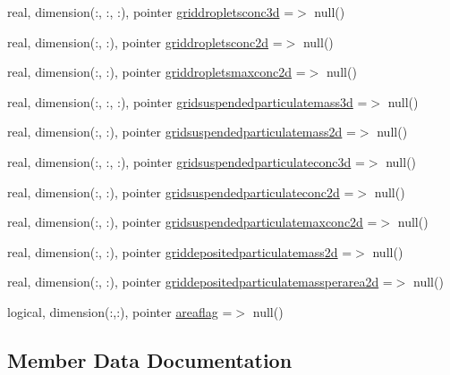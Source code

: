 \begin{DoxyCompactItemize}
\item 
real, dimension(\+:, \+:, \+:), pointer \mbox{\hyperlink{structmodulelagrangianglobal_1_1t__hns_a24d88f0d41953f8078e5120f6715c4c6}{griddropletsconc3d}} =$>$ null()
\item 
real, dimension(\+:, \+:), pointer \mbox{\hyperlink{structmodulelagrangianglobal_1_1t__hns_a94c7defd7962a88333649b6e70a9f622}{griddropletsconc2d}} =$>$ null()
\item 
real, dimension(\+:, \+:), pointer \mbox{\hyperlink{structmodulelagrangianglobal_1_1t__hns_a8c8d362c074c4f0a90645ab5f9ed11bb}{griddropletsmaxconc2d}} =$>$ null()
\item 
real, dimension(\+:, \+:, \+:), pointer \mbox{\hyperlink{structmodulelagrangianglobal_1_1t__hns_aadc41747ac1fda89a708c67521f2ee80}{gridsuspendedparticulatemass3d}} =$>$ null()
\item 
real, dimension(\+:, \+:), pointer \mbox{\hyperlink{structmodulelagrangianglobal_1_1t__hns_aa7f8fb50807c0aa67c8b986b97a2fe3e}{gridsuspendedparticulatemass2d}} =$>$ null()
\item 
real, dimension(\+:, \+:, \+:), pointer \mbox{\hyperlink{structmodulelagrangianglobal_1_1t__hns_ad73dbbd023990a944faf1c9c34f99dfc}{gridsuspendedparticulateconc3d}} =$>$ null()
\item 
real, dimension(\+:, \+:), pointer \mbox{\hyperlink{structmodulelagrangianglobal_1_1t__hns_ad700d33d1a3e25ae589ef0d0abff1d58}{gridsuspendedparticulateconc2d}} =$>$ null()
\item 
real, dimension(\+:, \+:), pointer \mbox{\hyperlink{structmodulelagrangianglobal_1_1t__hns_a40ca312cb61b0bd9cbbe94332c14ba1e}{gridsuspendedparticulatemaxconc2d}} =$>$ null()
\item 
real, dimension(\+:, \+:), pointer \mbox{\hyperlink{structmodulelagrangianglobal_1_1t__hns_afcaeee2dd304fa6f313fd3190c548627}{griddepositedparticulatemass2d}} =$>$ null()
\item 
real, dimension(\+:, \+:), pointer \mbox{\hyperlink{structmodulelagrangianglobal_1_1t__hns_a6bb016ec36392395ed17f60f97217aa8}{griddepositedparticulatemassperarea2d}} =$>$ null()
\item 
logical, dimension(\+:,\+:), pointer \mbox{\hyperlink{structmodulelagrangianglobal_1_1t__hns_a263c8261e7d37b5062c19c2390ac700d}{areaflag}} =$>$ null()
\end{DoxyCompactItemize}


\subsection{Member Data Documentation}
\mbox{\label{structmodulelagrangianglobal_1_1t__hns_a263c8261e7d37b5062c19c2390ac700d}} 
